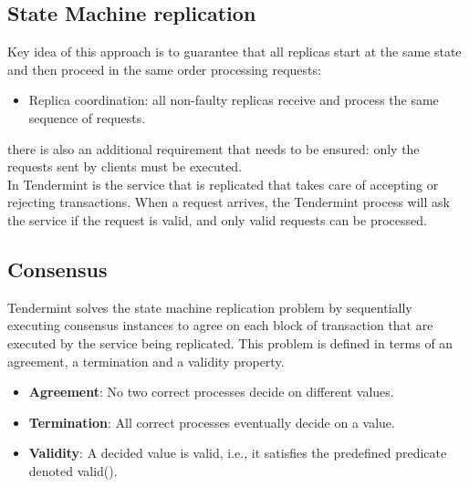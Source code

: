\documentclass{article}
\begin{document}
   \subsection{State Machine replication}
   Key idea of this approach is to guarantee that all replicas start at the same state and then proceed in the same order processing requests:
   \begin{itemize}
   	\item Replica coordination: all non-faulty replicas receive and process the same sequence of requests.
   \end{itemize}
   there is also an additional requirement that needs to be ensured: only the requests sent by clients must be executed.\\
   In Tendermint is the service that is replicated that takes care of accepting or rejecting transactions. When a request arrives, the Tendermint process will ask the service if the request is valid, and only valid requests can be processed.
   \subsection{Consensus}
   Tendermint solves the state machine replication problem by sequentially executing consensus instances to agree on each block of transaction that are executed by the service being replicated. This problem is defined in terms of an agreement, a termination and a validity property.
   \begin{itemize}
   	\item \textbf{Agreement}: No two correct processes decide on different values.
	\item \textbf{Termination}: All correct processes eventually decide on a value.
	\item \textbf{Validity}: A decided value is valid, i.e., it satisfies the predefined predicate denoted valid().
   \end{itemize}
   \newpage
\end{document}
